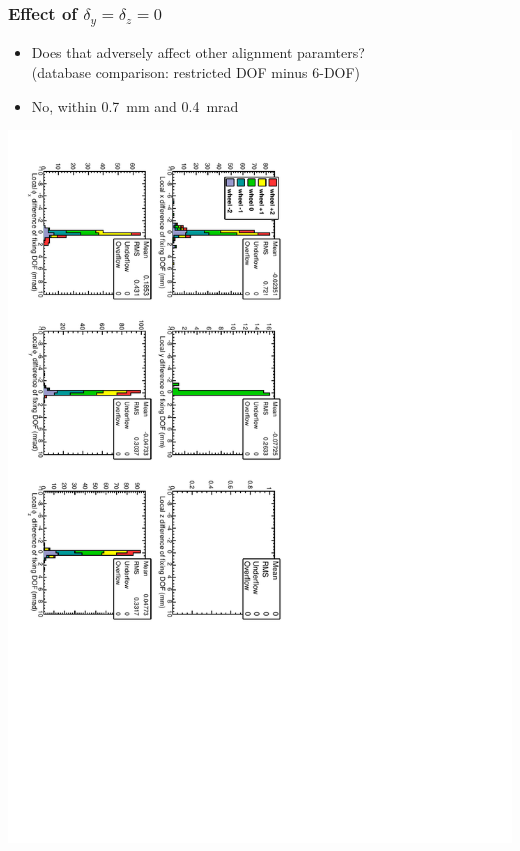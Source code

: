 \documentclass[compress]{beamer}
\begin{document}
\begin{frame}
\frametitle{Effect of $\delta_y = \delta_z = 0$}

\begin{itemize}
\item Does that adversely affect other alignment paramters? \\ (database comparison: restricted DOF minus 6-DOF)
\item No, within 0.7~mm and 0.4~mrad
\end{itemize}

\vfill
\includegraphics[height=\linewidth, angle=90]{data_effect_of_fixingdof.pdf}
\end{frame}
\end{document}
